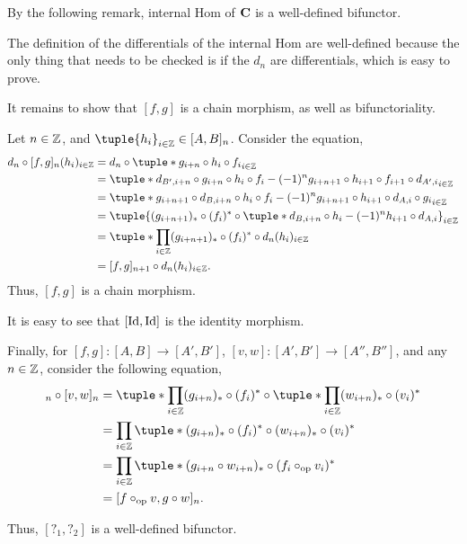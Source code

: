 By the following remark, internal Hom of \( \operatorname{\mathbf{C}} \) is a well-defined bifunctor.
\begin{remark}
    The definition of the differentials of the internal Hom are well-defined because the only thing that needs to be checked is if the \( d_n \) are differentials, which is easy to prove.

    It remains to show that \( [f, g] \) is a chain morphism, as well as bifunctoriality.

    Let \( n \in {\mathbb{Z}} \), and \( \tuple{h_i}_{i \in \Zb} \in [A, B]_n \). Consider the equation,
    \begin{align*}
        d_n \circ [f, g]_n (h_i)_{i \in \Zb} &= d_n \circ \tuple*{g_{i + n} \circ h_i \circ f_i}_{i \in \Zb} \\
        &= \tuple*{d_{B', i + n} \circ g_{i + n} \circ h_i \circ f_i - (-1)^n g_{i + n + 1} \circ h_{i + 1} \circ f_{i + 1} \circ d_{A', i}}_{i \in \Zb} \\
        &= \tuple*{g_{i + n + 1} \circ d_{B, i + n} \circ h_i \circ f_i - (-1)^n g_{i + n + 1} \circ h_{i + 1} \circ d_{A, i} \circ g_i}_{i \in \Zb} \\
        &= \tuple{(g_{i + n + 1})_* \circ (f_i)^* \circ \tuple*{d_{B, i + n} \circ h_i - (-1)^n h_{i + 1} \circ d_{A, i}}}_{i \in \Zb} \\
        &= \tuple*{\prod_{i \in \Zb} (g_{i + n + 1})_* \circ (f_i)^*} \circ d_n (h_i)_{i \in \Zb} \\
        &= [f, g]_{n + 1} \circ d_n (h_i)_{i \in \Zb}.
    \end{align*}
    Thus, \( [f, g] \) is a chain morphism.

    It is easy to see that \( [\operatorname{Id}, \operatorname{Id}] \) is the identity morphism.

    Finally, for \( [f, g]: [A, B] \to [A', B'] \), \( [v, w]: [A', B'] \to [A'', B''] \), and any \( n \in {\mathbb{Z}} \), consider the following equation,
    \begin{align*}
        [f, g]_n \circ [v, w]_n &= \tuple*{\prod_{i \in \Zb} (g_{i + n})_* \circ (f_i)^*} \circ \tuple*{\prod_{i \in \Zb} (w_{i + n})_* \circ (v_i)^*} \\
        &= \prod_{i \in \Zb} \tuple*{(g_{i + n})_* \circ (f_i)^* \circ (w_{i + n})_* \circ (v_i)^*} \\
        &= \prod_{i \in \Zb} \tuple*{(g_{i + n} \circ w_{i + n})_* \circ(f_i \circ_{\op} v_i)^*} \\
        &= [f \circ_{\op} v, g \circ w]_n.
    \end{align*}

    Thus, \( [?_1, ?_2] \) is a well-defined bifunctor.
\end{remark}

